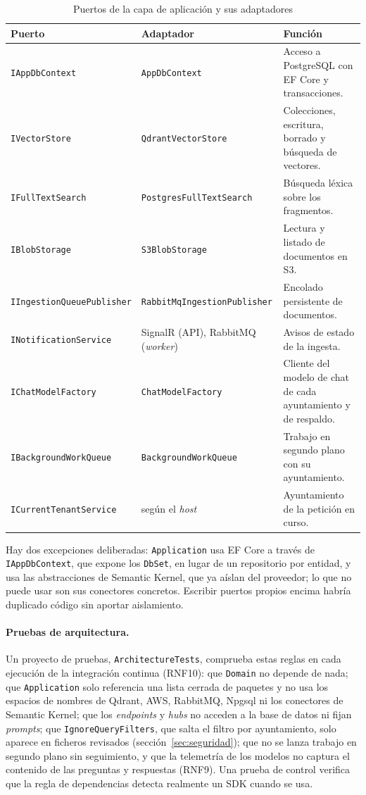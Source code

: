 \begin{table}[htbp]
  \centering
  \small
  \caption{Puertos de la capa de aplicación y sus adaptadores}
  \label{tab:puertos}
  \begin{tabularx}{\textwidth}{@{}l l X@{}}
    \toprule
    \textbf{Puerto} & \textbf{Adaptador} & \textbf{Función} \\
    \midrule
    \texttt{IAppDbContext} & \texttt{AppDbContext} & Acceso a PostgreSQL con EF Core y transacciones. \\
    \texttt{IVectorStore} & \texttt{QdrantVectorStore} & Colecciones, escritura, borrado y búsqueda de vectores. \\
    \texttt{IFullTextSearch} & \texttt{PostgresFullTextSearch} & Búsqueda léxica sobre los fragmentos. \\
    \texttt{IBlobStorage} & \texttt{S3BlobStorage} & Lectura y listado de documentos en S3. \\
    \texttt{IIngestionQueuePublisher} & \texttt{RabbitMqIngestionPublisher} & Encolado persistente de documentos. \\
    \texttt{INotificationService} & SignalR (API), RabbitMQ (\emph{worker}) & Avisos de estado de la ingesta. \\
    \texttt{IChatModelFactory} & \texttt{ChatModelFactory} & Cliente del modelo de chat de cada ayuntamiento y de respaldo. \\
    \texttt{IBackgroundWorkQueue} & \texttt{BackgroundWorkQueue} & Trabajo en segundo plano con su ayuntamiento. \\
    \texttt{ICurrentTenantService} & según el \emph{host} & Ayuntamiento de la petición en curso. \\
    \bottomrule
  \end{tabularx}
\end{table}

Hay dos excepciones deliberadas: \texttt{Application} usa EF Core a través de \texttt{IAppDbContext}, que expone los \texttt{DbSet}, en lugar de un repositorio por entidad, y usa las abstracciones de Semantic Kernel, que ya aíslan del proveedor; lo que no puede usar son sus conectores concretos. Escribir puertos propios encima habría duplicado código sin aportar aislamiento.

\paragraph{Pruebas de arquitectura.} Un proyecto de pruebas, \texttt{ArchitectureTests}, comprueba estas reglas en cada ejecución de la integración continua (RNF10): que \texttt{Domain} no depende de nada; que \texttt{Application} solo referencia una lista cerrada de paquetes y no usa los espacios de nombres de Qdrant, AWS, RabbitMQ, Npgsql ni los conectores de Semantic Kernel; que los \emph{endpoints} y \emph{hubs} no acceden a la base de datos ni fijan \emph{prompts}; que \texttt{IgnoreQueryFilters}, que salta el filtro por ayuntamiento, solo aparece en ficheros revisados (sección~\ref{sec:seguridad}); que no se lanza trabajo en segundo plano sin seguimiento, y que la telemetría de los modelos no captura el contenido de las preguntas y respuestas (RNF9). Una prueba de control verifica que la regla de dependencias detecta realmente un SDK cuando se usa.

